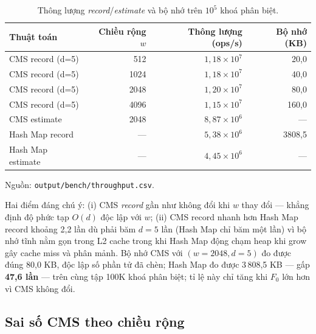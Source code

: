\begin{table}[H]
  \centering
  \caption{Thông lượng \textit{record}/\textit{estimate} và bộ nhớ trên $10^5$ khoá phân biệt.}
  \label{tab:throughput}
  \begin{tabular}{@{}l r r r@{}}
    \toprule
    \textbf{Thuật toán} & \textbf{Chiều rộng $w$} & \textbf{Thông lượng (ops/s)} & \textbf{Bộ nhớ (KB)} \\
    \midrule
    CMS record (d=5)    & 512                     & $1{,}18 \times 10^{7}$       & 20{,}0 \\
    CMS record (d=5)    & 1024                    & $1{,}18 \times 10^{7}$       & 40{,}0 \\
    CMS record (d=5)    & 2048                    & $1{,}20 \times 10^{7}$       & 80{,}0 \\
    CMS record (d=5)    & 4096                    & $1{,}15 \times 10^{7}$       & 160{,}0 \\
    CMS estimate        & 2048                    & $8{,}87 \times 10^{6}$       & --- \\
    \midrule
    Hash Map record     & ---                     & $5{,}38 \times 10^{6}$       & 3808{,}5 \\
    Hash Map estimate   & ---                     & $4{,}45 \times 10^{6}$       & --- \\
    \bottomrule
  \end{tabular}
\end{table}

\noindent Nguồn: \texttt{output/bench/throughput.csv}.

Hai điểm đáng chú ý: (i) CMS \textit{record} gần như không đổi khi $w$ thay đổi --- khẳng định độ phức tạp $O(d)$ độc lập với $w$; (ii) CMS record nhanh hơn Hash Map record khoảng 2{,}2 lần dù phải băm $d = 5$ lần (Hash Map chỉ băm một lần) vì bộ nhớ tĩnh nằm gọn trong L2 cache trong khi Hash Map động chạm heap khi grow gây cache miss và phân mảnh. Bộ nhớ CMS với $(w=2048, d=5)$ đo được đúng 80{,}0 KB, độc lập số phần tử đã chèn; Hash Map đo được 3\,808{,}5 KB --- gấp \textbf{47{,}6 lần} --- trên cùng tập 100K khoá phân biệt; tỉ lệ này chỉ tăng khi $F_0$ lớn hơn vì CMS không đổi.

\subsection{Sai số CMS theo chiều rộng}

